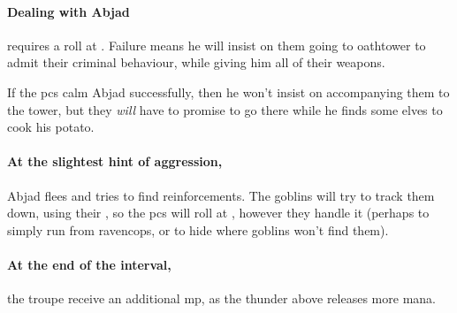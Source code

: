 \begin{multicols}{2}

\paragraph{Dealing with Abjad}
requires a  roll at \tn[9].
Failure means he will insist on them going to \gls{oathtower} to admit their criminal behaviour, while giving him all of their \glspl{weapon}.

If the \glspl{pc} calm Abjad successfully, then he won't insist on accompanying them to the tower, but they \emph{will} have to promise to go there while he finds some elves to cook his potato.

\paragraph{At the slightest hint of aggression,}
Abjad flees and tries to find reinforcements.
The goblins will try to track them down, using their , so the \glspl{pc} will roll at \tn, however they handle it (perhaps  to simply run from \gls{ravencops}, or  to hide where goblins won't find them).

\paragraph{At the end of the \gls{interval},}
the troupe receive an additional \gls{mp}, as the thunder above releases more mana.


\end{multicols}

\stopcontents[sq]

